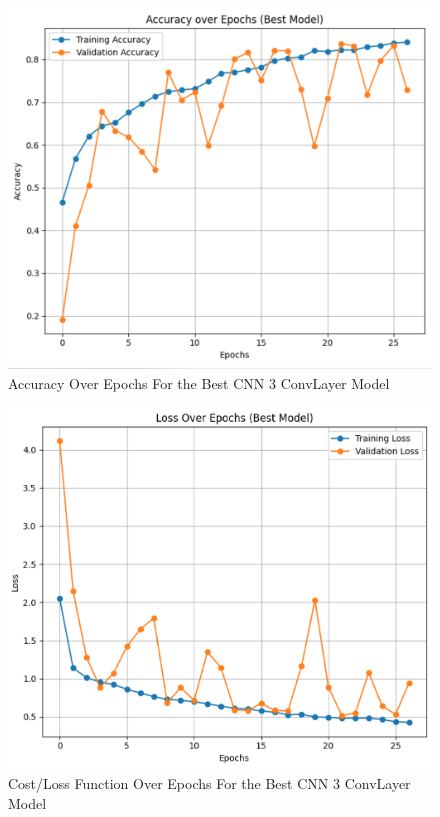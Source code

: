 \documentclass[conference]{IEEEtran}
\begin{document}
\begin{figure} [ht]
    \centering
    \includegraphics[width=\linewidth]{img/accuracyCNN.png}
    \caption{Accuracy Over Epochs For the Best CNN 3 ConvLayer Model}
    \label{fig:accuracycnn}
\end{figure}

\begin{figure} [ht]
    \centering
    \includegraphics[width=\linewidth]{img/lossCNN.png}
    \caption{Cost/Loss Function Over Epochs  For the Best CNN 3 ConvLayer Model}
    \label{fig:losscnn}
\end{figure}
\end{document}
